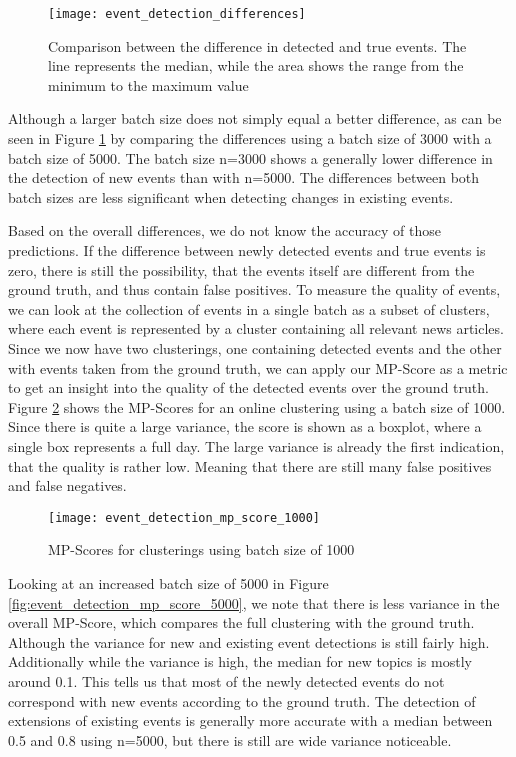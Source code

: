 \begin{figure}[h]
    \centering
    \texttt{[image: event\_detection\_differences]}
    \caption{Comparison between the difference in detected and true events. The line represents the median, while the area shows the range from the minimum to the maximum value}
    \label{fig:event_detection_differences}
\end{figure}

Although a larger batch size does not simply equal a better difference, as can be seen in Figure \ref{fig:event_detection_differences} by comparing the differences using a batch size of 3000 with a batch size of 5000. The batch size n=3000 shows a generally lower difference in the detection of new events than with n=5000. The differences between both batch sizes are less significant when detecting changes in existing events.

Based on the overall differences, we do not know the accuracy of those predictions. 
If the difference between newly detected events and true events is zero, there is still the possibility, that the events itself are different from the ground truth, and thus contain false positives. To measure the quality of events, we can look at the collection of events in a single batch as a subset of clusters, where each event is represented by a cluster containing all relevant news articles. Since we now have two clusterings, one containing detected events and the other with events taken from the ground truth, we can apply our MP-Score as a metric to get an insight into the quality of the detected events over the ground truth. Figure \ref{fig:event_detection_mp_score_1000} shows the MP-Scores for an online clustering using a batch size of 1000. Since there is quite a large variance, the score is shown as a boxplot, where a single box represents a full day. The large variance is already the first indication, that the quality is rather low. Meaning that there are still many false positives and false negatives.

\begin{figure}[h]
    \centering
    \texttt{[image: event\_detection\_mp\_score\_1000]}
    \caption{MP-Scores for clusterings using batch size of 1000}
    \label{fig:event_detection_mp_score_1000}
\end{figure}

Looking at an increased batch size of 5000 in Figure \ref{fig:event_detection_mp_score_5000}, we note that there is less variance in the overall MP-Score, which compares the full clustering with the ground truth. Although the variance for new and existing event detections is still fairly high. Additionally while the variance is high, the median for new topics is mostly around 0.1. This tells us that most of the newly detected events do not correspond with new events according to the ground truth. The detection of extensions of existing events is generally more accurate with a median between 0.5 and 0.8 using n=5000, but there is still are wide variance noticeable.

